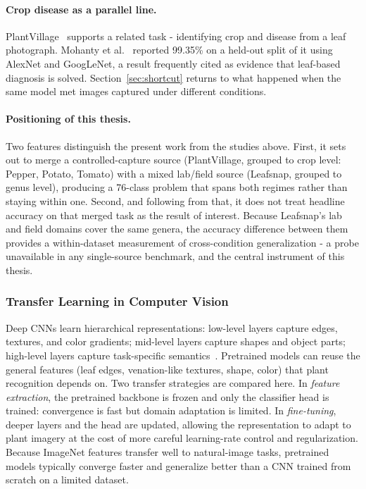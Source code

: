 \documentclass[12pt,a4paper]{article}
\begin{document}
\paragraph{Crop disease as a parallel line.} PlantVillage~\cite{hughes2015} supports a related task - identifying crop and disease from a leaf photograph. Mohanty et al.~\cite{mohanty2016} reported 99.35\% on a held-out split of it using AlexNet and GoogLeNet, a result frequently cited as evidence that leaf-based diagnosis is solved. Section~\ref{sec:shortcut} returns to what happened when the same model met images captured under different conditions.

\paragraph{Positioning of this thesis.} Two features distinguish the present work from the studies above. First, it sets out to merge a controlled-capture source (PlantVillage, grouped to crop level: Pepper, Potato, Tomato) with a mixed lab/field source (Leafsnap, grouped to genus level), producing a 76-class problem that spans both regimes rather than staying within one. Second, and following from that, it does not treat headline accuracy on that merged task as the result of interest. Because Leafsnap's lab and field domains cover the same genera, the accuracy difference between them provides a within-dataset measurement of cross-condition generalization - a probe unavailable in any single-source benchmark, and the central instrument of this thesis.

\subsubsection{Transfer Learning in Computer Vision}
Deep CNNs learn hierarchical representations: low-level layers capture edges, textures, and color gradients; mid-level layers capture shapes and object parts; high-level layers capture task-specific semantics~\cite{yosinski2014}. Pretrained models can reuse the general features (leaf edges, venation-like textures, shape, color) that plant recognition depends on. Two transfer strategies are compared here. In \emph{feature extraction}, the pretrained backbone is frozen and only the classifier head is trained: convergence is fast but domain adaptation is limited. In \emph{fine-tuning}, deeper layers and the head are updated, allowing the representation to adapt to plant imagery at the cost of more careful learning-rate control and regularization. Because ImageNet features transfer well to natural-image tasks, pretrained models typically converge faster and generalize better than a CNN trained from scratch on a limited dataset.
\end{document}
